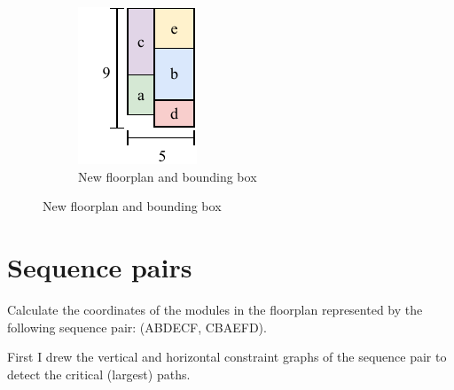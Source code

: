 \documentclass[a4paper, 10pt]{article}
\begin{document}
\begin{figure}[H]
\begin{subfigure}{0.35\textwidth}
        \includegraphics[trim=13 0 0 0,clip,width=0.6\linewidth]{3_floorplan2.pdf}
        \caption{New floorplan and bounding box}
        \label{}
    \end{subfigure}
\end{figure}

\section{Sequence pairs}

{\color{statement} Calculate the coordinates of the modules in the floorplan represented by the following sequence pair: (ABDECF, CBAEFD). }

First I drew the vertical and horizontal constraint graphs of the sequence pair to detect the critical (largest) paths.
\end{document}
